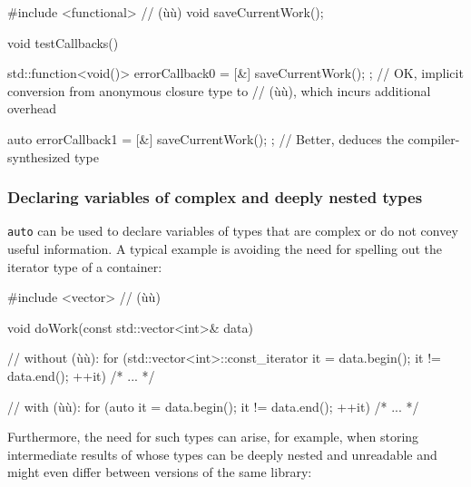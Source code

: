 \begin{emcppshiddenlisting}[emcppsbatch=e8]
#include <functional>      // (ù{}ù)
void saveCurrentWork();
\end{emcppshiddenlisting}
\begin{emcppslisting}[emcppsbatch=e8]
void testCallbacks()
{
    std::function<void()> errorCallback0 = [&]{ saveCurrentWork(); };
        // OK, implicit conversion from anonymous closure type to
        // (ù{}ù), which incurs additional overhead

    auto errorCallback1 = [&]{ saveCurrentWork(); };
        // Better, deduces the compiler-synthesized type
}
\end{emcppslisting}
    

\subsubsection[Declaring variables of complex and deeply nested types]{Declaring variables of complex and deeply nested types}\label{declaring-variables-of-complex-and-deeply-nested-types}

\lstinline!auto! can be used to declare variables of types that are complex
or do not convey useful information. A typical example is avoiding the
need for spelling out the iterator type of a container:

\begin{emcppshiddenlisting}[emcppsbatch=e9]
#include <vector>      // (ù{}ù)
\end{emcppshiddenlisting}
\begin{emcppslisting}[emcppsbatch=e9]
void doWork(const std::vector<int>& data)
{
    // without (ù{}ù):
    for (std::vector<int>::const_iterator it = data.begin();
         it != data.end();
         ++it) {
        /* ... */
    }

    // with (ù{}ù):
    for (auto it = data.begin(); it != data.end(); ++it) { /* ... */ }
}
\end{emcppslisting}
    
\noindent Furthermore, the need for such types can arise, for example, when
storing intermediate results of  whose types can
be deeply nested and unreadable and might even differ between versions of
the same library:

